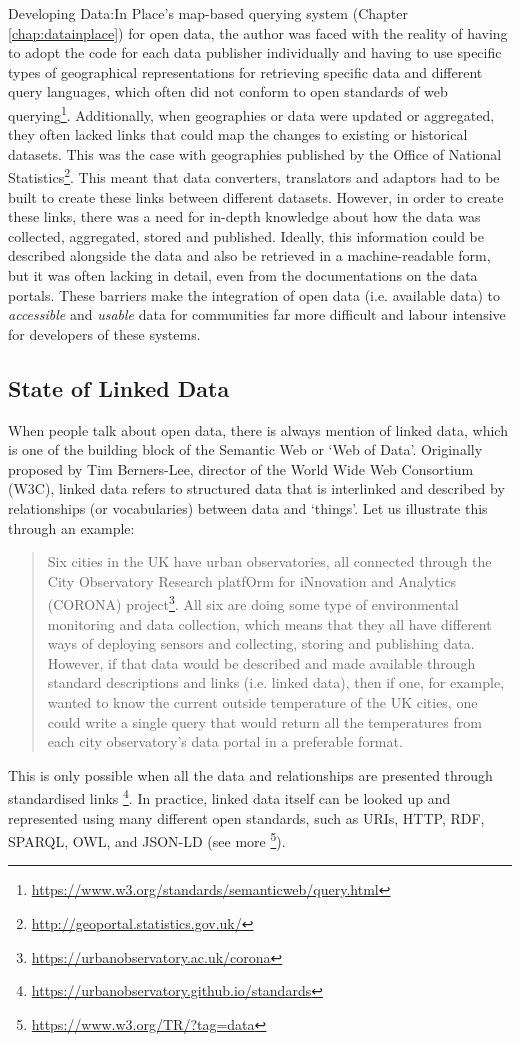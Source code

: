 Developing Data:In Place's map-based querying system (Chapter \ref{chap:datainplace}) for open data, the author was faced with the reality of having to adopt the code for each data publisher individually and having to use specific types of geographical representations for retrieving specific data and different query languages, which often did not conform to open standards of web querying\footnote{\url{https://www.w3.org/standards/semanticweb/query.html}}. Additionally, when geographies or data were updated or aggregated, they often lacked links that could map the changes to existing or historical datasets. This was the case with geographies published by the Office of National Statistics\footnote{\url{http://geoportal.statistics.gov.uk/}}. This meant that data converters, translators and adaptors had to be built to create these links between different datasets. However, in order to create these links, there was a need for in-depth knowledge about how the data was collected, aggregated, stored and published. Ideally, this information could be described alongside the data and also be retrieved in a machine-readable form, but it was often lacking in detail, even from the documentations on the data portals. These barriers make the integration of open data (i.e. available data) to \textit{accessible} and \textit{usable} data for communities far more difficult and labour intensive for developers of these systems. 

\subsection{State of Linked Data}
\label{sub:linkeddata}
When people talk about open data, there is always mention of linked data, which is one of the building block of the Semantic Web or `Web of Data'. Originally proposed by Tim Berners-Lee, director of the World Wide Web Consortium (W3C), linked data refers to structured data that is interlinked and described by relationships (or vocabularies) between data and `things'. Let us illustrate this through an example:
\begin{quote}
    Six cities in the UK have urban observatories, all connected through the City Observatory Research platfOrm for iNnovation and Analytics (CORONA) project\footnote{\url{https://urbanobservatory.ac.uk/corona}}. All six are doing some type of environmental monitoring and data collection, which means that they all have different ways of deploying sensors and collecting, storing and publishing data. However, if that data would be described and made available through standard descriptions and links (i.e. linked data), then if one, for example, wanted to know the current outside temperature of the UK cities, one could write a single query that would return all the temperatures from each city observatory's data portal in a preferable format. 
\end{quote}
This is only possible when all the data and relationships are presented through standardised links \footnote{\url{https://urbanobservatory.github.io/standards}}. In practice, linked data itself can be looked up and represented using many different open standards, such as URIs, HTTP, RDF, SPARQL, OWL, and JSON-LD (see more \footnote{\url{https://www.w3.org/TR/?tag=data}}).

